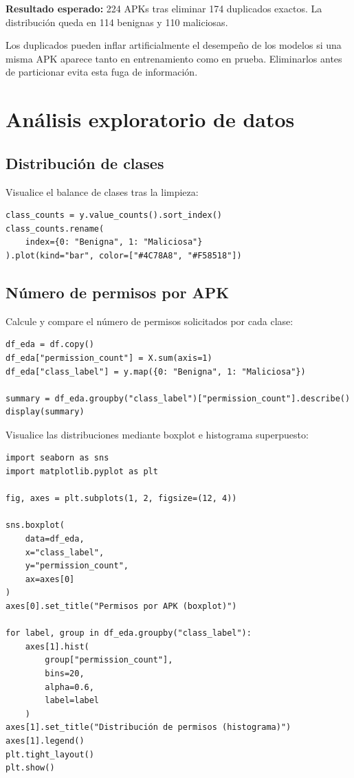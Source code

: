 \documentclass[
  coursetitle={Cómputo Nube y Tecnologías Emergentes},
  coursehours={96},
  coursedate={Verano 2026},
  doctype={Tutorial},
  otherlangs={english,french},
  authorname={Lázaro},
  authorsurname={Bustio-Martínez},
  authortitle={PhD},
  role={Profesor Investigador},
  email={lbustio@inaoe.mx},
  phone={5559504000},
  ext={7459},
  institution={Instituto Nacional de Astrofísica, Óptica y Electrónica (INAOE)},
  department={Maestría en Ciencias en Tecnologías de Seguridad},
  address={Luis Enrique Erro 1, Sta. Ma. Tonantzintla, San Andrés Cholula, CP 72840, Puebla, México},
  margin={0.5in}
]{../../lbustio_lecture_notes}
\begin{document}
\textbf{Resultado esperado:} 224 APKs tras eliminar 174 duplicados exactos. La distribución queda en 114 benignas y 110 maliciosas.

\begin{tcolorbox}[title=Por qué eliminar duplicados]
Los duplicados pueden inflar artificialmente el desempeño de los modelos si una misma APK aparece tanto en entrenamiento como en prueba. Eliminarlos antes de particionar evita esta fuga de información.
\end{tcolorbox}

\section{Análisis exploratorio de datos}

\subsection{Distribución de clases}

Visualice el balance de clases tras la limpieza:

\begin{lstlisting}
class_counts = y.value_counts().sort_index()
class_counts.rename(
    index={0: "Benigna", 1: "Maliciosa"}
).plot(kind="bar", color=["#4C78A8", "#F58518"])
\end{lstlisting}

\subsection{Número de permisos por APK}

Calcule y compare el número de permisos solicitados por cada clase:

\begin{lstlisting}
df_eda = df.copy()
df_eda["permission_count"] = X.sum(axis=1)
df_eda["class_label"] = y.map({0: "Benigna", 1: "Maliciosa"})

summary = df_eda.groupby("class_label")["permission_count"].describe()
display(summary)
\end{lstlisting}

Visualice las distribuciones mediante boxplot e histograma superpuesto:

\begin{lstlisting}
import seaborn as sns
import matplotlib.pyplot as plt

fig, axes = plt.subplots(1, 2, figsize=(12, 4))

sns.boxplot(
    data=df_eda,
    x="class_label",
    y="permission_count",
    ax=axes[0]
)
axes[0].set_title("Permisos por APK (boxplot)")

for label, group in df_eda.groupby("class_label"):
    axes[1].hist(
        group["permission_count"],
        bins=20,
        alpha=0.6,
        label=label
    )
axes[1].set_title("Distribución de permisos (histograma)")
axes[1].legend()
plt.tight_layout()
plt.show()
\end{lstlisting}
\end{document}
